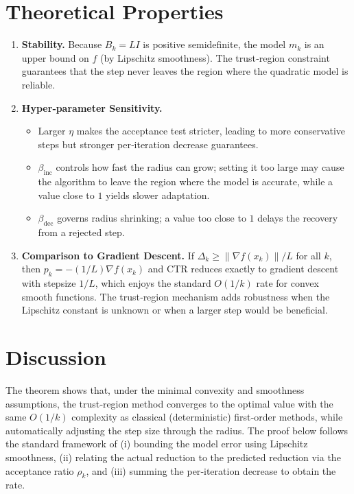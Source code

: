 \documentclass[11pt]{article}
\begin{document}
\section{Theoretical Properties}
\label{sec:properties}
\begin{enumerate}[label=\arabic*.]
\item \textbf{Stability.} Because $B_{k}=LI$ is positive semidefinite, the model
$m_{k}$ is an upper bound on $f$ (by Lipschitz smoothness). The trust‑region
constraint guarantees that the step never leaves the region where the quadratic
model is reliable.
\item \textbf{Hyper‑parameter Sensitivity.}
\begin{itemize}
\item Larger $\eta$ makes the acceptance test stricter, leading to more
conservative steps but stronger per‑iteration decrease guarantees.
\item $\beta_{\text{inc}}$ controls how fast the radius can grow; setting it too
large may cause the algorithm to leave the region where the model is accurate,
while a value close to $1$ yields slower adaptation.
\item $\beta_{\text{dec}}$ governs radius shrinking; a value too close to $1$
delays the recovery from a rejected step.
\end{itemize}
\item \textbf{Comparison to Gradient Descent.}  
If $\Delta_{k}\ge\|\nabla f(x_{k})\|/L$ for all $k$, then $p_{k}=-(1/L)\nabla f(x_{k})$
and CTR reduces exactly to gradient descent with stepsize $1/L$, which enjoys the
standard $O(1/k)$ rate for convex smooth functions. The trust‑region mechanism
adds robustness when the Lipschitz constant is unknown or when a larger step would
be beneficial.
\end{enumerate}

\section{Discussion}
\label{sec:discussion}
The theorem shows that, under the minimal convexity and smoothness assumptions,
the trust‑region method converges to the optimal value with the same $O(1/k)$
complexity as classical (deterministic) first‑order methods, while automatically
adjusting the step size through the radius. The proof below follows the standard
framework of (i) bounding the model error using Lipschitz smoothness, (ii) relating
the actual reduction to the predicted reduction via the acceptance ratio $\rho_{k}$,
and (iii) summing the per‑iteration decrease to obtain the rate.
\end{document}
